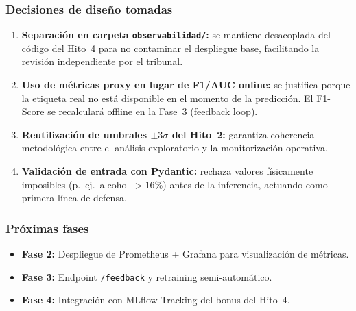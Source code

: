 \subsubsection{Decisiones de diseño tomadas}

\begin{enumerate}
    \item \textbf{Separación en carpeta \texttt{observabilidad/}:} se mantiene desacoplada del código del Hito~4 para no contaminar el despliegue base, facilitando la revisión independiente por el tribunal.
    \item \textbf{Uso de métricas proxy en lugar de F1/AUC online:} se justifica porque la etiqueta real no está disponible en el momento de la predicción. El F1-Score se recalculará offline en la Fase~3 (feedback loop).
    \item \textbf{Reutilización de umbrales $\pm 3\sigma$ del Hito~2:} garantiza coherencia metodológica entre el análisis exploratorio y la monitorización operativa.
    \item \textbf{Validación de entrada con Pydantic:} rechaza valores físicamente imposibles (p.\ ej.\ alcohol $>16\%$) antes de la inferencia, actuando como primera línea de defensa.
\end{enumerate}

\subsubsection{Próximas fases}

\begin{itemize}
    \item \textbf{Fase 2:} Despliegue de Prometheus + Grafana para visualización de métricas.
    \item \textbf{Fase 3:} Endpoint \texttt{/feedback} y retraining semi-automático.
    \item \textbf{Fase 4:} Integración con MLflow Tracking del bonus del Hito~4.
\end{itemize}
